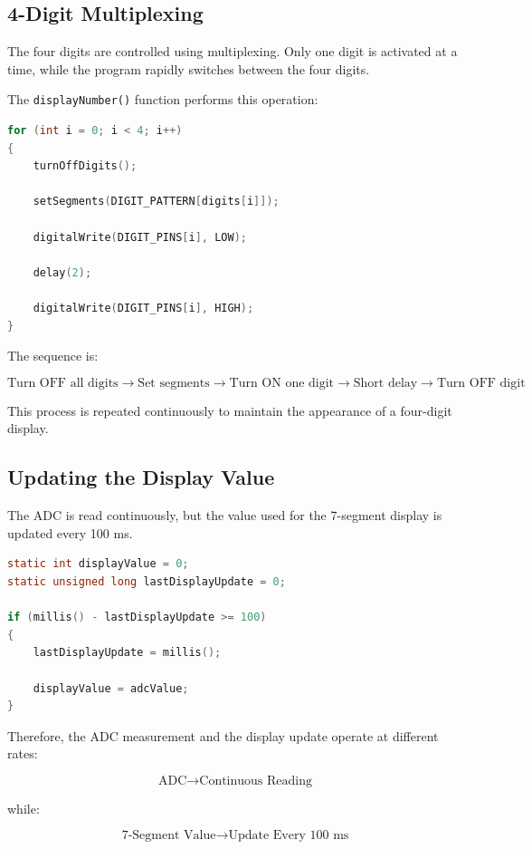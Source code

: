 \documentclass[12pt,a4paper]{article}
\begin{document}
\subsection{4-Digit Multiplexing}

The four digits are controlled using multiplexing. Only one digit is
activated at a time, while the program rapidly switches between the
four digits.

The \texttt{displayNumber()} function performs this operation:

\begin{lstlisting}[language=C]
for (int i = 0; i < 4; i++)
{
    turnOffDigits();

    setSegments(DIGIT_PATTERN[digits[i]]);

    digitalWrite(DIGIT_PINS[i], LOW);

    delay(2);

    digitalWrite(DIGIT_PINS[i], HIGH);
}
\end{lstlisting}

The sequence is:

\[
\text{Turn OFF all digits}
\rightarrow
\text{Set segments}
\rightarrow
\text{Turn ON one digit}
\rightarrow
\text{Short delay}
\rightarrow
\text{Turn OFF digit}
\]

This process is repeated continuously to maintain the appearance of a
four-digit display.

\subsection{Updating the Display Value}

The ADC is read continuously, but the value used for the 7-segment
display is updated every 100 ms.

\begin{lstlisting}[language=C]
static int displayValue = 0;
static unsigned long lastDisplayUpdate = 0;

if (millis() - lastDisplayUpdate >= 100)
{
    lastDisplayUpdate = millis();

    displayValue = adcValue;
}
\end{lstlisting}

Therefore, the ADC measurement and the display update operate at
different rates:

\[
\text{ADC}
\rightarrow
\text{Continuous Reading}
\]

while:

\[
\text{7-Segment Value}
\rightarrow
\text{Update Every 100 ms}
\]
\end{document}
